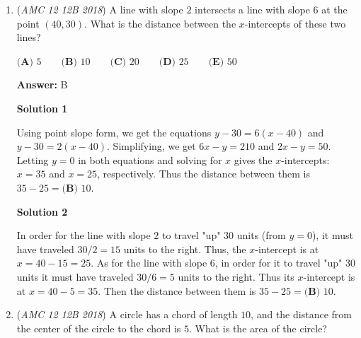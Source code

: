 \begin{enumerate}
 



\textbf{Solution 2}

Suppose that Sam's average speed during the last $30$ minutes was $x$ mph.

 Note that Sam's average speed during the entire trip was $\frac{96}{3/2}=64$ mph. Since Sam drove at $60$ mph, $65$ mph, and $x$ mph for the same duration ($30$ minutes each), his average speed during the entire trip was the average of $60$ mph, $65$ mph, and $x$ mph. We have
 \begin{align*} \frac{60+65+x}{3}&=64 \\ 60+65+x&=192 \\ x&=\boxed{\textbf{(D) } 67}. \end{align*}
~coolmath\_2018 ~MRENTHUSIASM

 


	\item (\textit{AMC 12 12B 2018}) A line with slope $2$ intersects a line with slope $6$ at the point $(40,30)$. What is the distance between the $x$-intercepts of these two lines? 


 $\textbf{(A) } 5 \qquad \textbf{(B) } 10 \qquad \textbf{(C) } 20 \qquad \textbf{(D) } 25 \qquad \textbf{(E) } 50$

 \textbf{Answer: }B



\textbf{Solution 1}

Using point slope form, we get the equations $y-30 = 6(x-40)$ and $y-30 = 2(x-40)$. Simplifying, we get $6x-y=210$ and $2x-y=50$. Letting $y=0$ in both equations and solving for $x$ gives the $x$-intercepts: $x=35$ and $x=25$, respectively. Thus the distance between them is $35-25=\boxed{\textbf{(B) } 10}$.

 



\textbf{Solution 2}

In order for the line with slope $2$ to travel "up" $30$ units (from $y=0$), it must have traveled $30/2=15$ units to the right. Thus, the $x$-intercept is at $x=40-15=25$. As for the line with slope $6$, in order for it to travel "up" $30$ units it must have traveled $30/6=5$ units to the right. Thus its $x$-intercept is at $x=40-5=35$. Then the distance between them is $35-25=\boxed{\textbf{(B) } 10}$.

 


	\item (\textit{AMC 12 12B 2018}) A circle has a chord of length $10$, and the distance from the center of the circle to the chord is $5$. What is the area of the circle?



\end{enumerate}

